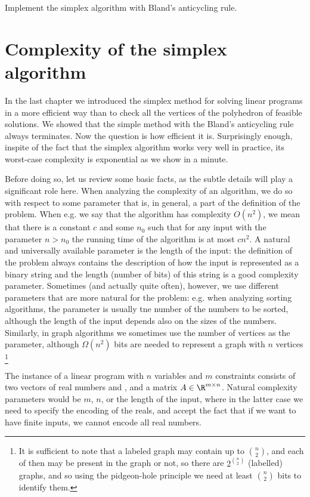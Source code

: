 \begin{prob}
  Implement the simplex algorithm with Bland's anticycling rule.
\end{prob}

\section{Complexity of the simplex algorithm}

\noindent
In the last chapter we introduced the simplex method for solving linear programs in a more efficient way
than to check all the vertices of the polyhedron of feasible solutions. We showed that the simple method
with the Bland's anticycling rule always terminates. Now the question is how efficient it is. 
Surprisingly enough, inspite of the fact that the simplex algorithm works very well in practice,
its worst-case complexity is exponential as we show in a minute.


\noindent
Before doing so, let us review some basic facts, as the subtle details will play a significant role here.
When analyzing the complexity of an algorithm, we do so with respect to some parameter that is, in general,
a part of the definition of the problem. When e.g. we say that the algorithm has complexity $O(n^2)$,
we mean that there is a constant $c$ and some $n_0$ such that for any input with the parameter
$n>n_0$ the running time of the algorithm is at most $cn^2$. A natural and universally available parameter
is the length of the input: the definition of the problem always contains the description of how the input is
represented as a binary string and the length (number of bits) of this string is a good complexity parameter.
Sometimes (and actually quite often), however, we use different parameters that are more natural for the problem:
e.g. when analyzing sorting algorithms, the parameter is usually tne number of the numbers to be sorted, although
the length of the input depends also on the sizes of the numbers. Similarly, in graph algorithms we sometimes
use the number of vertices as the parameter, although $\Omega(n^2)$ bits are needed 
to represent a graph with $n$ vertices
\footnote{It is sufficient to note that a labeled graph may contain up to  ${n\choose 2}$, and each of then 
  may be present in the graph or not, so there are $2^{n\choose 2}$ (labelled) graphs, and so using the
pidgeon-hole principle we need at least $n\choose 2$ bits to identify them.}

\noindent
The instance of a linear program with $n$ variables and $m$ constraints consists of two vectors of real numbers
 and , and a matrix  $A\in\R^{m\times n}$. Natural complexity parameters would be $m$, $n$, or the
length of the input, where in the latter case we need to specify the encoding of the reals, and accept the
fact that if we want to have finite inputs, we cannot encode all  real numbers.

